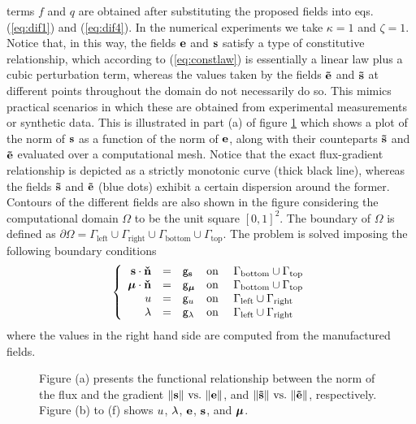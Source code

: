terms $f$ and $q$ are obtained after substituting the proposed fields 
into eqs. (\ref{eq:dif1}) and (\ref{eq:dif4}). 
In the numerical experiments we take $\kappa = 1$ and $\zeta = 1$.
Notice that, in this way, the fields $\mathbf{e}$ and $\mathbf{s}$ satisfy a type of 
constitutive relationship, which according to (\ref{eq:constlaw}) is essentially
a linear law plus a cubic perturbation term, whereas the values taken by the fields 
$\mathbf{\tilde{e}}$ and $\mathbf{\tilde{s}}$ at different points throughout the domain do not necessarily do so. 
This mimics practical scenarios in which these are obtained from experimental 
measurements or synthetic data. This is illustrated in part (a) of figure \ref{fig:all_fields_ref} which shows
a plot of the norm of $\mathbf{s}$ as a function of the norm of $\mathbf{e}$, along with their counteparts $\mathbf{\tilde{s}}$ and $\mathbf{\tilde{e}}$ evaluated over a computational mesh. 
Notice that the exact flux-gradient relationship is depicted as a strictly monotonic curve (thick black line), whereas the fields $\mathbf{\tilde{s}}$ and $\mathbf{\tilde{e}}$ (blue dots) exhibit a certain dispersion around the former. Contours of the different fields are also shown in the
figure considering the computational domain $\Omega$ to be the unit square $[0,1]^2$. The boundary of $\Omega$ is defined as $\partial \Omega = \Gamma_{\text{left}} \cup \Gamma_{\text{right}} \cup \Gamma_{\text{bottom}} \cup \Gamma_{\text{top}}$.
The problem is solved imposing the following boundary conditions
\begin{equation}
	\left\lbrace
	\begin{array}{rclll}
		\mathbf{s} \cdot \mathbf{\check{n}} 			&=& \mathsf{g}_{\mathbf{s}} 			&\mbox{on}&~\Gamma_{\text{bottom}} \cup \Gamma_{\text{top}} \\
		\boldsymbol{\mu} \cdot \mathbf{\check{n}} &=& \mathsf{g}_{\boldsymbol{\mu}} &\mbox{on}&~\Gamma_{\text{bottom}} \cup \Gamma_{\text{top}} \\
		u &=& \mathsf{g}_{u} &\mbox{on}&~\Gamma_{\text{left}} \cup \Gamma_{\text{right}} \\
		\lambda &=& \mathsf{g}_{\lambda} &\mbox{on}&~\Gamma_{\text{left}} \cup \Gamma_{\text{right}} \\
	\end{array}
	\right.
\end{equation}
where the values in the right hand side are computed from the manufactured fields.
\begin{figure}[h!]
	\centering
	\caption{Figure (a) presents the functional relationship between the norm of the flux and the gradient $\|\mathbf{s}\|~\mbox{vs.}~\|\mathbf{e}\|$, and $\|\mathbf{\tilde{s}}\|~\mbox{vs.}~\|\mathbf{\tilde{e}}\|$, respectively. Figure (b) to (f) shows
		$u$, $\lambda$, $\mathbf{e}$, $\mathbf{s}$, and $\boldsymbol{\mu}$.}
	\def\svgwidth{1.0\columnwidth}
	
	\label{fig:all_fields_ref}
\end{figure}

